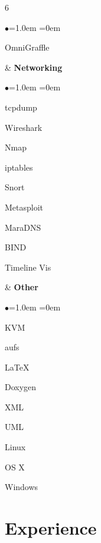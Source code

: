 \documentclass[margin,line]{resume}
\newenvironment{skills}{
  \begin{list}{\small$\bullet$}{\leftmargin=1.0em \itemindent=0em \small}
}{
  \end{list}
}
\begin{document}
\begin{resume}
\begin{ncolumn}{6}
\begin{skills}
  \item OmniGraffle
  \end{skills}
&
{\small\bf Networking}
  \begin{skills}
  \item tcpdump
  \item Wireshark
  \item Nmap
  \item iptables
  \item Snort
  \item Metasploit
  \item MaraDNS
  \item BIND
  \item Timeline Vis
  \end{skills}
&
{\small\bf Other}
  \begin{skills}
  \item KVM
  \item aufs
  \item \LaTeX
  \item Doxygen
  \item XML
  \item UML
  \item Linux
  \item OS X
  \item Windows
  \end{skills}
\end{ncolumn}

\section{Experience}


\end{resume}
\end{document}

